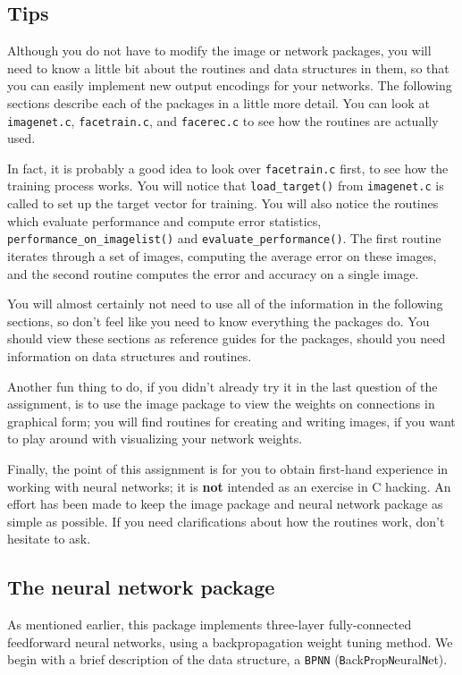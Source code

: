 \subsection{Tips}

Although you do not have to modify the image or network packages,
you will need to know a little bit about the routines and data structures
in them, so that you can easily implement new output encodings for
your networks.  The following sections describe each of the packages
in a little more detail.  You can look at {\tt imagenet.c},
{\tt facetrain.c}, and {\tt facerec.c} to see how the routines are
actually used.  

In fact, it is probably a good idea to look over {\tt facetrain.c}
first, to see how the training process works.  You will notice
that {\tt load\_target()} from {\tt imagenet.c} is called to set
up the target vector for training.  You will also notice the
routines which evaluate performance and compute error statistics,
{\tt performance\_on\_imagelist()} and {\tt evaluate\_performance()}.
The first routine iterates through a set of images, computing the
average error on these images, and the second routine computes
the error and accuracy on a single image.

You will almost certainly not need to use all of the information
in the following sections, so don't feel like you need to know
everything the packages do.  You should view these sections
as reference guides for the packages, should you need information
on data structures and routines.

Another fun thing to do, if you didn't already try it in the last
question of the assignment, is to use the image package
to view the weights on connections in graphical form; you will find
routines for creating and writing images, if you want to play around
with visualizing your network weights.

Finally, the point of this assignment is for you to obtain first-hand
experience in working with neural networks; it is {\bf not} intended as an
exercise in C hacking.  An effort has been made to keep the image package
and neural network package as simple as possible.  If you need
clarifications about how the routines work, don't hesitate to ask.

\subsection{The neural network package}

As mentioned earlier, this package implements three-layer fully-connected
feedforward neural networks, using a backpropagation weight tuning
method.  We begin with a brief description of the data structure,
a {\tt BPNN} ({\tt B}ack{\tt P}rop{\tt N}eural{\tt N}et).

